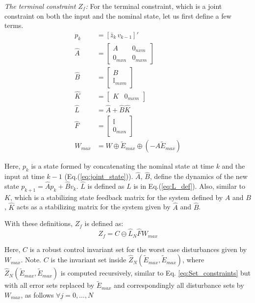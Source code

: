 \textit{The terminal constraint $Z_f$:}
For the terminal constraint, which is a joint constraint on both the input and the nominal state, let us first define a few terms.
\begin{subequations}
\begin{align}
p_k &=[\bar{z}_k \, v_{k-1}]' \label{eq:joint_state} \\
\hat{A} &= \begin{bmatrix} A & 0_{nxm} \\ 0_{mxn} & 0_{mxm}   \end{bmatrix} \label{eq:A_hat} \\
\hat{B} &= \begin{bmatrix}  B \\ \mathbb{I}_{mxm} \end{bmatrix} \label{eq:B_hat} \\
\hat{K} &= \begin{bmatrix}  K & 0_{mxm}  \end{bmatrix} \label{eq:K_hat} \\
\hat{L} &= \hat{A}+\hat{B}\hat{K} \label{eq:L_hat} \\
\hat{F} &= \begin{bmatrix} \mathbb{I} \\ 0_{mxn} \end{bmatrix} \\
W_{max} &= W \oplus \tilde{E}_{max} \oplus (-A\tilde{E}_{max}) \label{eq:W_max} 
\end{align}
\end{subequations}

Here, $p_k$ is a state formed by concatenating the nominal state at time $k$ and the input at time $k-1$ (Eq.(\ref{eq:joint_state})). $\hat{A}$, $\hat{B}$, define the dynamics of the new state $p_{k+1} = \hat{A}p_{k} + \hat{B}v_k$. $\hat{L}$ is defined as $L$ is in Eq.(\ref{eq:L_def}). Also, similar to $K$, which is a stabilizing state feedback matrix for the system defined by $A$ and $B$, $\hat{K}$ acts as a stabilizing matrix for the system given by $\hat{A}$ and $\hat{B}$.

With these definitions, $Z_f$ is defined as:
\begin{equation}
Z_f = C\ominus \hat{L}_N\hat{F}{W}_{max}
\end{equation}

Here, $C$ is a robust control invariant set for the worst case disturbances given by $W_{max}$. Note. $C$ is the invariant set inside $\hat{Z}_N(\tilde{E}_{max},\tilde{E}_{max})$, where $\hat{Z}_N(\tilde{E}_{max},\tilde{E}_{max})$ is computed recursively, similar to Eq. \ref{eq:Set_constraints} but with all error sets replaced by $\tilde{E}_{max}$ and correspondingly all disturbance sets by $W_{max}$, as follows $\forall j=0,\dotsc,N$


